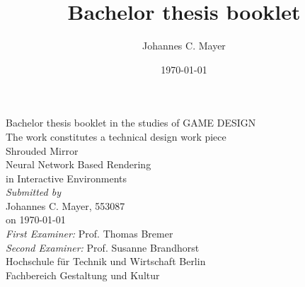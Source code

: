 \documentclass[a4paper, twoside, 10pt]{report}
\title{Bachelor thesis booklet}
\author{Johannes C. Mayer}
\date{\today}
\newcommand{\blankpage}{\null\thispagestyle{empty}\addtocounter{page}{0}\newpage}
\begin{document}
\begin{titlepage}
\end{titlepage}


\blankpage


\begin{flushleft}
\begin{spacing}{1.5}
	{\large
		Bachelor thesis booklet in the studies of GAME DESIGN \\
		The work constitutes a technical design work piece \\
	\vspace*{\fill}
		{\Huge Shrouded Mirror} \\
		{\Large Neural Network Based Rendering \\ in Interactive Environments \\}
	\vspace*{\fill}
		\textit{Submitted by} \\
		Johannes C. Mayer, 553087 \\
		on \today \\
	\vspace*{1cm}
		\textit{First Examiner:} Prof. Thomas Bremer \\
		\textit{Second Examiner:} Prof. Susanne Brandhorst \\
	\vspace*{1cm}
		Hochschule f\"ur Technik und Wirtschaft Berlin \\
		Fachbereich Gestaltung und Kultur \\
	}
\end{spacing}
\end{flushleft}



\tableofcontents
\clearpage
\end{document}
